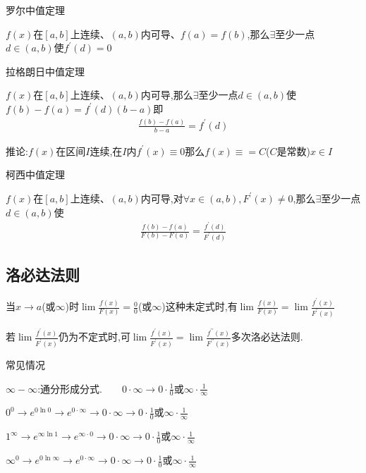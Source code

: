 \documentclass[utf8]{ctexart}
\begin{document}
罗尔中值定理

$f(x)$在$\left[a,b\right]$上连续、$(a,b)$内可导、$f(a)=f(b)$,那么$\exists $至少一点$d \in (a,b)$使$f^\prime (d)=0$

拉格朗日中值定理

$f(x)$在$\left[a,b\right]$上连续、$(a,b)$内可导,那么$\exists $至少一点$d \in (a,b)$使$f(b)-f(a)=f^\prime(d)(b-a)$即
\begin{align}
    \displaystyle \frac{f(b)-f(a)}{b-a}=f^\prime(d)
\end{align}

推论:$f(x)$在区间$I$连续,在$I$内$f^\prime(x)\equiv 0$那么$f(x)\equiv=C$($C$是常数)$x\in I$

柯西中值定理

$f(x)$在$\left[a,b\right]$上连续、$(a,b)$内可导,对$\forall x\in(a,b),F^\prime(x)\neq 0$,那么$\exists $至少一点$d \in (a,b)$使
\begin{align}
    \displaystyle \frac{f(b)-f(a)}{F(b)-F(a)}=\frac{f^\prime(d)}{F^\prime (d)}
\end{align}

\subsection{\heiti 洛必达法则}

当$x\to a$(或$\infty $)时$\displaystyle \lim \frac{f(x)}{F(x)}=\frac{0}{0}$(或$\infty$)这种未定式时,有$\displaystyle \lim \frac{f(x)}{F(x)}=\displaystyle \lim \frac{f^\prime(x)}{F^\prime(x)}$

若$\displaystyle \lim \frac{f^\prime(x)}{F^\prime(x)}$仍为不定式时,可$\displaystyle \lim \frac{f^\prime(x)}{F^\prime(x)}=\displaystyle \lim \frac{f^{\prime\prime}(x)}{F^{\prime\prime}(x)}$多次洛必达法则.

常见情况

$\infty - \infty$:通分形成分式.\ \ \ \ $\displaystyle 0\cdot \infty\rightarrow 0\cdot\frac{1}{0}$或$\displaystyle \infty\cdot\frac{1}{\infty}$

$0^0\rightarrow e^{0\ln0}\rightarrow e^{0\cdot \infty}\rightarrow \displaystyle 0\cdot \infty\rightarrow 0\cdot\frac{1}{0}$或$\displaystyle \infty\cdot\frac{1}{\infty}$

$1^\infty \rightarrow e^{\infty\ln1}\rightarrow e^{\infty \cdot 0}\rightarrow \displaystyle 0\cdot \infty\rightarrow 0\cdot\frac{1}{0}$或$\displaystyle \infty\cdot\frac{1}{\infty}$

$\infty^0\rightarrow e^{0\ln\infty}\rightarrow e^{0\cdot \infty}\rightarrow \displaystyle 0\cdot \infty\rightarrow 0\cdot\frac{1}{0}$或$\displaystyle \infty\cdot\frac{1}{\infty}$
\end{document}
